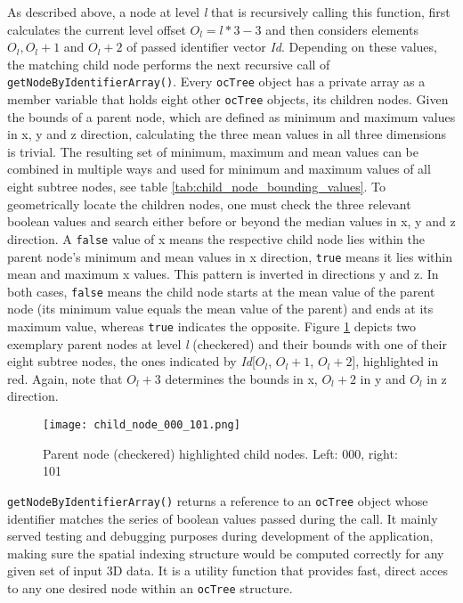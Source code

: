 As described above, a node at level \textit{l} that is recursively calling this function, first calculates the current level offset $O_l = l*3-3$ and then considers elements $O_l, O_l+1$ and $O_l+2$ of passed identifier vector \textit{Id}. Depending on these values, the matching child node performs the next recursive call of \texttt{getNodeByIdentifierArray()}. Every \texttt{ocTree} object has a private array as a member variable that holds eight other \texttt{ocTree} objects, its children nodes. Given the bounds of a parent node, which are defined as minimum and maximum values in x, y and z direction, calculating the three mean values in all three dimensions is trivial. The resulting  set of minimum, maximum and mean values can be combined in multiple ways and used for minimum and maximum values of all eight subtree nodes, see table \ref{tab:child_node_bounding_values}. To geometrically locate the children nodes, one must check the three relevant boolean values and search either before or beyond the median values in x, y and z direction. A \texttt{false} value of x means the respective child node lies within the parent node's minimum and mean values in x direction, \texttt{true} means it lies within mean and maximum x values. This pattern is inverted in directions y and z. In both cases, \texttt{false} means the child node starts at the mean value of the parent node (its minimum value equals the mean value of the parent) and ends at its maximum value, whereas \texttt{true} indicates the opposite. Figure \ref{fig:child_node_000_101.png} depicts two exemplary parent nodes at level \textit{l} (checkered) and their bounds with one of their eight subtree nodes, the ones indicated by \textit{Id}[$O_l$, $O_l+1$, $O_l+2$], highlighted in red. Again, note that \texttt{$O_l+3$} determines the bounds in x, \texttt{$O_l+2$} in y and \texttt{$O_l$} in z direction.

\begin{figure}[htb]
  \centering
  \texttt{[image: child\_node\_000\_101.png]}\\ %
  \caption{Parent node (checkered) highlighted child nodes. Left: 000, right: 101}\label{fig:child_node_000_101.png}
\end{figure}

	\texttt{getNodeByIdentifierArray()} returns a reference to an \texttt{ocTree} object whose identifier matches the series of boolean values passed during the call. It mainly served testing and debugging purposes during development of the application, making sure the spatial indexing structure would be computed correctly for any given set of input 3D data. It is a utility function that provides fast, direct acces to any one desired node within an \texttt{ocTree} structure.

